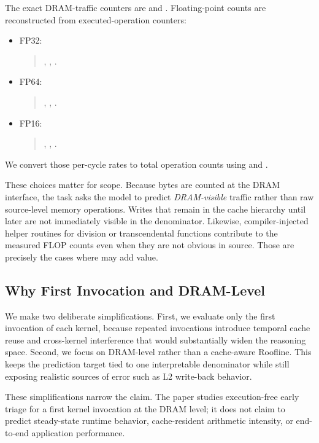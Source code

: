 The exact DRAM-traffic counters are  and .
Floating-point counts are reconstructed from executed-operation counters:
\begin{itemize}[leftmargin=1.2em]
  \item FP32:
  \begin{quote}\raggedright\footnotesize
    ,
    ,
    .
  \end{quote}
  \item FP64:
  \begin{quote}\raggedright\footnotesize
    ,
    ,
    .
  \end{quote}
  \item FP16:
  \begin{quote}\raggedright\footnotesize
    ,
    ,
    .
  \end{quote}
\end{itemize}
We convert those per-cycle rates to total operation counts using
and
.

These choices matter for scope.
Because bytes are counted at the DRAM interface, the task asks the model to predict \emph{DRAM-visible} traffic rather than raw source-level memory operations.
Writes that remain in the cache hierarchy until later are not immediately visible in the denominator.
Likewise, compiler-injected helper routines for division or transcendental functions contribute to the measured FLOP counts even when they are not obvious in source.
Those are precisely the cases where \sourcesass may add value.

\subsection{Why First Invocation and DRAM-Level \rai}

We make two deliberate simplifications.
First, we evaluate only the first invocation of each kernel, because repeated invocations introduce temporal cache reuse and cross-kernel interference that would substantially widen the reasoning space.
Second, we focus on DRAM-level \rai rather than a cache-aware Roofline.
This keeps the prediction target tied to one interpretable denominator while still exposing realistic sources of error such as L2 write-back behavior.

These simplifications narrow the claim.
The paper studies execution-free early triage for a first kernel invocation at the DRAM level; it does not claim to predict steady-state runtime behavior, cache-resident arithmetic intensity, or end-to-end application performance.
